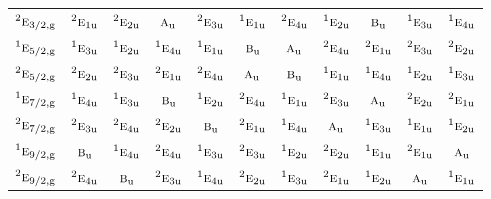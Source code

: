 \documentclass[10pt,a4paper]{article}
\numberwithin{equation}{section}
\newcommand{\irr}[1]{\text{\normalfont\scshape #1}}
\newcommand{\conjpair}[1]{{}^{#1}}
\newcommand{\ptag}[1]{\mathrm{#1}}
\begin{document}
{\begin{longtable}{@{}lcccccccccc@{}}
$\conjpair{2}\irr{e}_{3/2,\ptag{g}}$ & $\conjpair{2}\irr{e}_{1\ptag{u}}$ & $\conjpair{2}\irr{e}_{2\ptag{u}}$ & $\irr{a}_{\ptag{u}}$ & $\conjpair{2}\irr{e}_{3\ptag{u}}$ & $\conjpair{1}\irr{e}_{1\ptag{u}}$ & $\conjpair{2}\irr{e}_{4\ptag{u}}$ & $\conjpair{1}\irr{e}_{2\ptag{u}}$ & $\irr{b}_{\ptag{u}}$ & $\conjpair{1}\irr{e}_{3\ptag{u}}$ & $\conjpair{1}\irr{e}_{4\ptag{u}}$\\
$\conjpair{1}\irr{e}_{5/2,\ptag{g}}$ & $\conjpair{1}\irr{e}_{3\ptag{u}}$ & $\conjpair{1}\irr{e}_{2\ptag{u}}$ & $\conjpair{1}\irr{e}_{4\ptag{u}}$ & $\conjpair{1}\irr{e}_{1\ptag{u}}$ & $\irr{b}_{\ptag{u}}$ & $\irr{a}_{\ptag{u}}$ & $\conjpair{2}\irr{e}_{4\ptag{u}}$ & $\conjpair{2}\irr{e}_{1\ptag{u}}$ & $\conjpair{2}\irr{e}_{3\ptag{u}}$ & $\conjpair{2}\irr{e}_{2\ptag{u}}$\\
$\conjpair{2}\irr{e}_{5/2,\ptag{g}}$ & $\conjpair{2}\irr{e}_{2\ptag{u}}$ & $\conjpair{2}\irr{e}_{3\ptag{u}}$ & $\conjpair{2}\irr{e}_{1\ptag{u}}$ & $\conjpair{2}\irr{e}_{4\ptag{u}}$ & $\irr{a}_{\ptag{u}}$ & $\irr{b}_{\ptag{u}}$ & $\conjpair{1}\irr{e}_{1\ptag{u}}$ & $\conjpair{1}\irr{e}_{4\ptag{u}}$ & $\conjpair{1}\irr{e}_{2\ptag{u}}$ & $\conjpair{1}\irr{e}_{3\ptag{u}}$\\
$\conjpair{1}\irr{e}_{7/2,\ptag{g}}$ & $\conjpair{1}\irr{e}_{4\ptag{u}}$ & $\conjpair{1}\irr{e}_{3\ptag{u}}$ & $\irr{b}_{\ptag{u}}$ & $\conjpair{1}\irr{e}_{2\ptag{u}}$ & $\conjpair{2}\irr{e}_{4\ptag{u}}$ & $\conjpair{1}\irr{e}_{1\ptag{u}}$ & $\conjpair{2}\irr{e}_{3\ptag{u}}$ & $\irr{a}_{\ptag{u}}$ & $\conjpair{2}\irr{e}_{2\ptag{u}}$ & $\conjpair{2}\irr{e}_{1\ptag{u}}$\\
$\conjpair{2}\irr{e}_{7/2,\ptag{g}}$ & $\conjpair{2}\irr{e}_{3\ptag{u}}$ & $\conjpair{2}\irr{e}_{4\ptag{u}}$ & $\conjpair{2}\irr{e}_{2\ptag{u}}$ & $\irr{b}_{\ptag{u}}$ & $\conjpair{2}\irr{e}_{1\ptag{u}}$ & $\conjpair{1}\irr{e}_{4\ptag{u}}$ & $\irr{a}_{\ptag{u}}$ & $\conjpair{1}\irr{e}_{3\ptag{u}}$ & $\conjpair{1}\irr{e}_{1\ptag{u}}$ & $\conjpair{1}\irr{e}_{2\ptag{u}}$\\
$\conjpair{1}\irr{e}_{9/2,\ptag{g}}$ & $\irr{b}_{\ptag{u}}$ & $\conjpair{1}\irr{e}_{4\ptag{u}}$ & $\conjpair{2}\irr{e}_{4\ptag{u}}$ & $\conjpair{1}\irr{e}_{3\ptag{u}}$ & $\conjpair{2}\irr{e}_{3\ptag{u}}$ & $\conjpair{1}\irr{e}_{2\ptag{u}}$ & $\conjpair{2}\irr{e}_{2\ptag{u}}$ & $\conjpair{1}\irr{e}_{1\ptag{u}}$ & $\conjpair{2}\irr{e}_{1\ptag{u}}$ & $\irr{a}_{\ptag{u}}$\\
$\conjpair{2}\irr{e}_{9/2,\ptag{g}}$ & $\conjpair{2}\irr{e}_{4\ptag{u}}$ & $\irr{b}_{\ptag{u}}$ & $\conjpair{2}\irr{e}_{3\ptag{u}}$ & $\conjpair{1}\irr{e}_{4\ptag{u}}$ & $\conjpair{2}\irr{e}_{2\ptag{u}}$ & $\conjpair{1}\irr{e}_{3\ptag{u}}$ & $\conjpair{2}\irr{e}_{1\ptag{u}}$ & $\conjpair{1}\irr{e}_{2\ptag{u}}$ & $\irr{a}_{\ptag{u}}$ & $\conjpair{1}\irr{e}_{1\ptag{u}}$\\

\end{longtable}}
\end{document}
